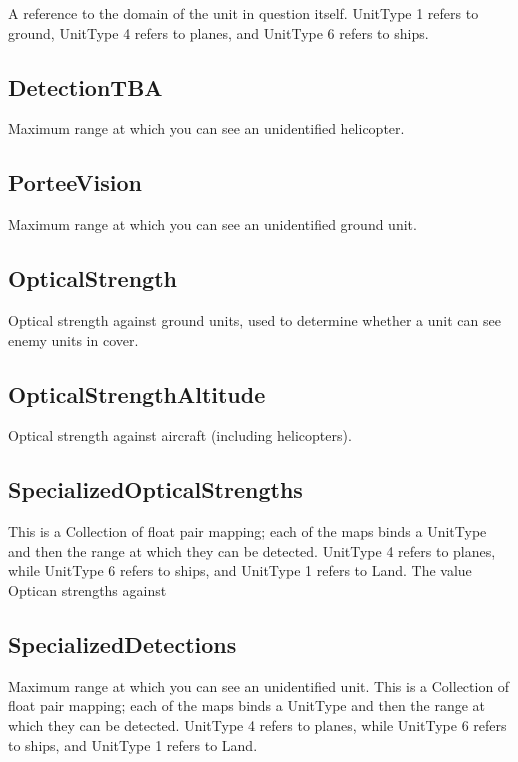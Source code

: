 \documentclass{article}
\begin{document}
A reference to the domain of the unit in question itself. UnitType 1 refers to ground, UnitType 4 refers to planes, and UnitType 6 refers to ships.

\subsection{DetectionTBA}

Maximum range at which you can see an unidentified helicopter.

\subsection{PorteeVision}

Maximum range at which you can see an unidentified ground unit.

\subsection{OpticalStrength}

Optical strength against ground units, used to determine whether a unit can see enemy units in cover.

\subsection{OpticalStrengthAltitude}

Optical strength against aircraft (including helicopters).

\subsection{SpecializedOpticalStrengths}

This is a Collection of float pair mapping; each of the maps binds a UnitType and then the range at which they can be detected. UnitType 4 refers to planes, while UnitType 6 refers to ships, and UnitType 1 refers to Land. The value Optican strengths against 

\subsection{SpecializedDetections}

Maximum range at which you can see an unidentified unit. This is a Collection of float pair mapping; each of the maps binds a UnitType and then the range at which they can be detected. UnitType 4 refers to planes, while UnitType 6 refers to ships, and UnitType 1 refers to Land.
\end{document}
